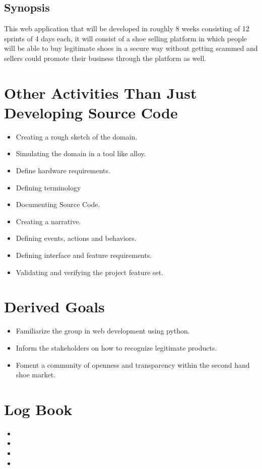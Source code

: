 \subsection{Synopsis}
This web application that will be developed in roughly 8 weeks consisting of 12 sprints of 4 days each, it will consist of a shoe selling platform in which people will be able to buy legitimate shoes in a secure way without getting scammed and sellers could promote their business through the platform as well.
\section{Other Activities Than Just Developing Source Code}
\begin{itemize}
  \item Creating a rough sketch of the domain.
  \item Simulating the domain in a tool like alloy.
  \item Define hardware requirements.
  \item Defining terminology
  \item Documenting Source Code.
  \item Creating a narrative.
  \item Defining events, actions and behaviors.
  \item Defining interface and feature requirements.
  \item Validating and verifying the project feature set.
\end{itemize}
\section{Derived Goals}
\begin{itemize}
  \item Familiarize the group in web development using python.
  \item Inform the stakeholders on how to recognize legitimate products.
  \item Foment a community of openness and transparency within the second hand shoe market.
\end{itemize}
\section{Log Book}
\begin{itemize}
  \item {}
  \item {}
  \item {}
        \item {}
\end{itemize}
